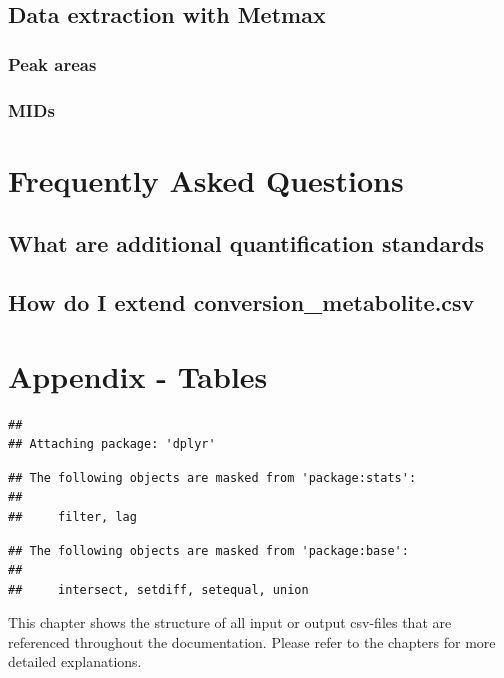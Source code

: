\documentclass[]{book}
\begin{document}
\section{Data extraction with Metmax}\label{data-extraction-with-metmax}

\subsection{Peak areas}\label{peak-areas}

\subsection{MIDs}\label{mids}

\chapter{Frequently Asked Questions}\label{FAQ}

\section{What are additional quantification
standards}\label{what-are-additional-quantification-standards}

\section{How do I extend
conversion\_metabolite.csv}\label{how-do-i-extend-conversion_metabolite.csv}

\chapter{Appendix - Tables}\label{tables}

\begin{verbatim}
## 
## Attaching package: 'dplyr'
\end{verbatim}

\begin{verbatim}
## The following objects are masked from 'package:stats':
## 
##     filter, lag
\end{verbatim}

\begin{verbatim}
## The following objects are masked from 'package:base':
## 
##     intersect, setdiff, setequal, union
\end{verbatim}

This chapter shows the structure of all input or output csv-files that
are referenced throughout the documentation. Please refer to the
chapters for more detailed explanations.
\end{document}
